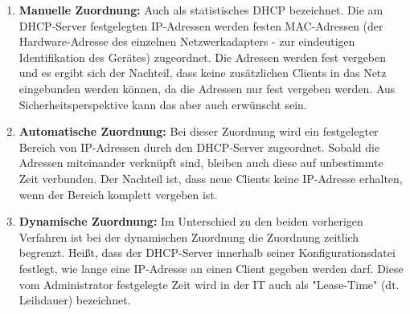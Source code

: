 \documentclass[10pt]{article}
\begin{document}
\begin{enumerate}
    \item \textbf{Manuelle Zuordnung: }Auch als statistisches DHCP bezeichnet. Die am DHCP-Server festgelegten IP-Adressen werden festen MAC-Adressen (der Hardware-Adresse des einzelnen Netzwerkadapters - zur eindeutigen Identifikation des Gerätes) zugeordnet. Die Adressen werden fest vergeben und es ergibt sich der Nachteil, dass keine zusätzlichen Clients in das Netz eingebunden werden können, da die Adressen nur fest vergeben werden. Aus Sicherheitsperspektive kann das aber auch erwünscht sein.
    \item \textbf{Automatische Zuordnung:} Bei dieser Zuordnung wird ein festgelegter Bereich von IP-Adressen durch den DHCP-Server zugeordnet. Sobald die Adressen miteinander verknüpft sind, bleiben auch diese auf unbestimmte Zeit verbunden. Der Nachteil ist, dass neue Clients keine IP-Adresse erhalten, wenn der Bereich komplett vergeben ist.
    \item \textbf{Dynamische Zuordnung:} Im Unterschied zu den beiden vorherigen Verfahren ist bei der dynamischen Zuordnung die Zuordnung zeitlich begrenzt. Heißt, dass der DHCP-Server innerhalb seiner Konfigurationsdatei festlegt, wie lange eine IP-Adresse an einen Client gegeben werden darf. Diese vom Administrator festgelegte Zeit wird in der IT auch als "Lease-Time" (dt. Leihdauer) bezeichnet.
\end{enumerate}
\end{document}
